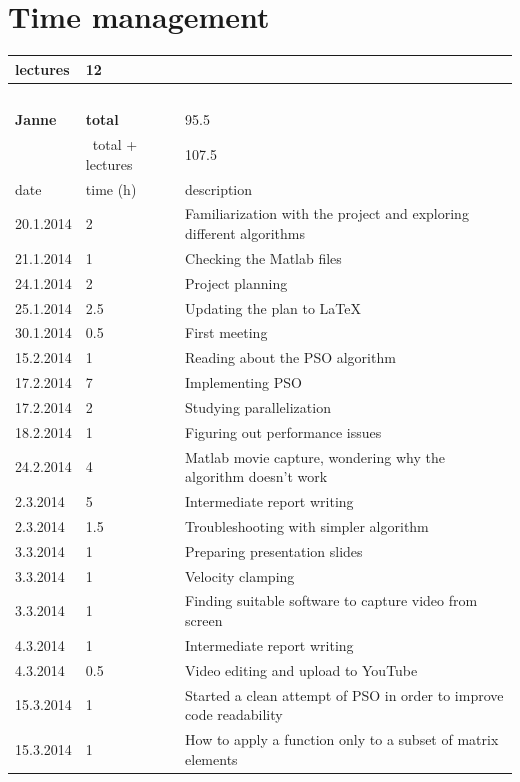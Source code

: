 \documentclass[twoside]{article}
\begin{document}
\section{Time management}
\begin{longtable}{ | l | l | p{10cm} | }
\hline
	lectures & 12 & \  \\ \hline
	\  & \  & \  \\ \hline
	\textbf{Janne} & \textbf{total} & 95.5 \\ \hline
	\ & \ total + lectures & 107.5  \\ \hline
	date & time (h) & description \\ \hline
	20.1.2014 & 2 & Familiarization with the project and exploring different algorithms \\ \hline
	21.1.2014 & 1 & Checking the Matlab files \\ \hline
	24.1.2014 & 2 & Project planning \\ \hline
	25.1.2014 & 2.5 & Updating the plan to LaTeX \\ \hline
	30.1.2014 & 0.5 & First meeting \\ \hline
	15.2.2014 & 1 & Reading about the PSO algorithm \\ \hline
	17.2.2014 & 7 & Implementing PSO \\ \hline
	17.2.2014 & 2 & Studying parallelization \\ \hline
	18.2.2014 & 1 & Figuring out performance issues \\ \hline
	24.2.2014 & 4 & Matlab movie capture, wondering why the algorithm doesn't work \\ \hline
	2.3.2014 & 5 & Intermediate report writing \\ \hline
	2.3.2014 & 1.5 & Troubleshooting with simpler algorithm \\ \hline
	3.3.2014 & 1 & Preparing presentation slides \\ \hline
	3.3.2014 & 1 & Velocity clamping \\ \hline
	3.3.2014 & 1 & Finding suitable software to capture video from screen \\ \hline
	4.3.2014 & 1 & Intermediate report writing \\ \hline
	4.3.2014 & 0.5 & Video editing and upload to YouTube \\ \hline
	15.3.2014 & 1 & Started a clean attempt of PSO in order to improve code readability \\ \hline
	15.3.2014 & 1 & How  to apply a function only to a subset of matrix elements \\ \hline

\end{longtable}
\end{document}
